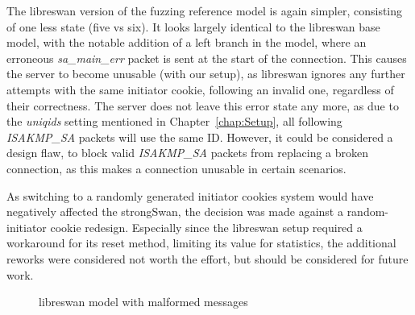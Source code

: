 The libreswan version of the fuzzing reference model is again simpler, consisting of one less state (five vs six). It looks largely identical to the libreswan base model, with the notable addition of a left branch in the model, where an erroneous \emph{sa\_main\_err} packet is sent at the start of the connection. This causes the server to become unusable (with our setup), as libreswan ignores any further attempts with the same initiator cookie, following an invalid one, regardless of their correctness. The server does not leave this error state any more, as due to the \emph{uniqids} setting mentioned in Chapter~\ref{chap:Setup}, all following \emph{ISAKMP\_SA} packets will use the same ID. However, it could be considered a design flaw, to block valid \emph{ISAKMP\_SA} packets from replacing a broken connection, as this makes a connection unusable in certain scenarios.

As switching to a randomly generated initiator cookies system would have negatively affected the strongSwan, the decision was made against a random-initiator cookie redesign. Especially since the libreswan setup required a workaround for its reset method, limiting its value for statistics, the additional reworks were considered not worth the effort, but should be considered for future work.

\begin{figure}
	\vspace*{\fill}
	\noindent
	\hspace*{-4.5\oddsidemargin}%
	\caption{libreswan model with malformed messages}
	\label{fig:learnedmodellibrereference}
	\vspace*{\fill}
\end{figure}

\newpage

